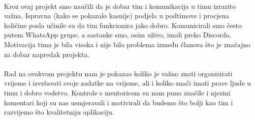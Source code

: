 \\
Kroz ovaj projekt smo naučili da je dobar tim i komunikacija u timu izrazito važna. Ispravna (kako se pokazalo kasnije) podjela u podtimove i procjena količine posla učinile su da tim funkcionira jako dobro. Komunicirali smo često putem WhatsApp grupe, a sastanke smo, osim uživo, imali preko Discorda. Motivacija tima je bila visoka i nije bilo problema između članova što je značajno za dobar napredak projekta. \\
\\
Rad na ovakvom projektu nam je pokazao koliko je važno znati organizirati vrijeme i izvršavati svoje zadatke na vrijeme, ali i koliko znači imati prave ljude u timu i dobro vodstvo. Kontrole s mentoricom su nam puno značile i njezini komentari koji su nas usmjeravali i motivirali da budemo što bolji kao tim i razvijemo što kvalitetniju aplikaciju. \\
  
     

		
		
		\eject 